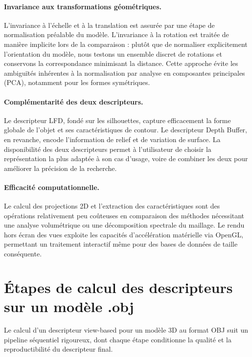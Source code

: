 \documentclass[11pt,a4paper,oneside]{report}
\begin{document}
\paragraph{Invariance aux transformations géométriques.} L'invariance à l'échelle et à la translation est assurée par une étape de normalisation préalable du modèle. L'invariance à la rotation est traitée de manière implicite lors de la comparaison : plutôt que de normaliser explicitement l'orientation du modèle, nous testons un ensemble discret de rotations et conservons la correspondance minimisant la distance. Cette approche évite les ambiguïtés inhérentes à la normalisation par analyse en composantes principales (PCA), notamment pour les formes symétriques.

\paragraph{Complémentarité des deux descripteurs.} Le descripteur LFD, fondé sur les silhouettes, capture efficacement la forme globale de l'objet et ses caractéristiques de contour. Le descripteur Depth Buffer, en revanche, encode l'information de relief et de variation de surface. La disponibilité des deux descripteurs permet à l'utilisateur de choisir la représentation la plus adaptée à son cas d'usage, voire de combiner les deux pour améliorer la précision de la recherche.

\paragraph{Efficacité computationnelle.} Le calcul des projections 2D et l'extraction des caractéristiques sont des opérations relativement peu coûteuses en comparaison des méthodes nécessitant une analyse volumétrique ou une décomposition spectrale du maillage. Le rendu hors écran des vues exploite les capacités d'accélération matérielle via OpenGL, permettant un traitement interactif même pour des bases de données de taille conséquente.

\section{Étapes de calcul des descripteurs sur un modèle .obj}

Le calcul d'un descripteur view-based pour un modèle 3D au format OBJ suit un pipeline séquentiel rigoureux, dont chaque étape conditionne la qualité et la reproductibilité du descripteur final.
\end{document}
